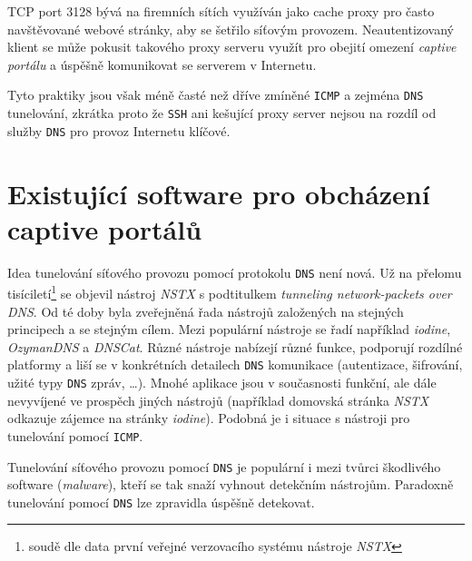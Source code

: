 \documentclass[thesis=M,czech]{FITthesis}[2012/10/20]
\begin{document}
TCP port 3128 bývá na firemních sítích využíván jako cache proxy pro často navštěvované webové stránky, aby se šetřilo síťovým provozem. Neautentizovaný klient se může pokusit takového proxy serveru využít pro obejití omezení \textit{captive portálu} a úspěšně komunikovat se serverem v Internetu.

Tyto praktiky jsou však méně časté než dříve zmíněné \texttt{ICMP} a zejména \texttt{DNS} tunelování, zkrátka proto že \texttt{SSH} ani kešující proxy server nejsou na rozdíl od služby \texttt{DNS} pro provoz Internetu klíčové.







%



\section{Existující software pro obcházení captive portálů}

Idea tunelování síťového provozu pomocí protokolu \texttt{DNS} není nová. Už na přelomu tisíciletí\footnote{soudě dle data první veřejné verzovacího systému nástroje \textit{NSTX}} se objevil nástroj \textit{NSTX} s podtitulkem \textit{tunneling network-packets over DNS}. Od té doby byla zveřejněná řada nástrojů založených na stejných principech a se stejným cílem. Mezi populární\cite{sans-dns-tunels} nástroje se řadí například \textit{iodine}, \textit{OzymanDNS} a \textit{DNSCat}. Různé nástroje nabízejí různé funkce, podporují rozdílné platformy a liší se v konkrétních detailech \texttt{DNS} komunikace (autentizace, šifrování, užité typy \texttt{DNS} zpráv, \ldots). Mnohé aplikace jsou v současnosti funkční, ale dále nevyvíjené ve prospěch jiných nástrojů (například domovská stránka \textit{NSTX} odkazuje zájemce na stránky \textit{iodine}). Podobná je i situace s nástroji pro tunelování pomocí \texttt{ICMP}.

Tunelování síťového provozu pomocí \texttt{DNS} je populární\cite{sans-dns-tunels} i mezi tvůrci škodlivého software (\textit{malware}), kteří se tak snaží vyhnout detekčním nástrojům. Paradoxně tunelování pomocí \texttt{DNS} lze zpravidla úspěšně detekovat\cite{bakalarka-detekce-tunelu}.
\end{document}
